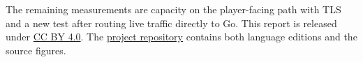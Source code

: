\documentclass[11pt,a4paper]{article}
\begin{document}
The remaining measurements are capacity on the player-facing path with TLS and a new test after
routing live traffic directly to Go. This report is released under
\href{https://creativecommons.org/licenses/by/4.0/}{CC BY 4.0}. The
\href{https://github.com/somany-flower4u/multiplayer-perf-report}{project repository} contains
both language editions and the source figures.
\FloatBarrier



\end{document}
